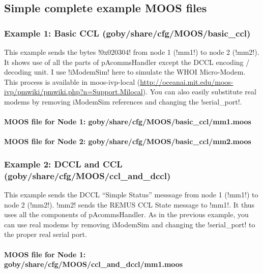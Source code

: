 \subsection{Simple complete example MOOS files}

\subsubsection{Example 1: Basic CCL (goby/share/cfg/MOOS/basic\_ccl)}\label{sec:moos_example_1}
This example sends the bytes !0x020304! from node 1 (!mm1!) to node 2 (!mm2!). It shows use of all the parts of pAcommsHandler except the DCCL encoding / decoding unit. I use !iModemSim! here to simulate the WHOI Micro-Modem. This process is available in moos-ivp-local (\url{http://oceanai.mit.edu/moos-ivp/pmwiki/pmwiki.php?n=Support.Milocal}). You can also easily substitute real modems by removing iModemSim references and changing the !serial_port!.

\paragraph{MOOS file for Node 1: goby/share/cfg/MOOS/basic\_ccl/mm1.moos}
\resetbvlinenumber

\paragraph{MOOS file for Node 2: goby/share/cfg/MOOS/basic\_ccl/mm2.moos}
\resetbvlinenumber

\subsubsection{Example 2: DCCL and CCL (goby/share/cfg/MOOS/ccl\_and\_dccl)}
This example sends the DCCL ``Simple Status'' messsage from node 1 (!mm1!) to node 2 (!mm2!). !mm2! sends the REMUS CCL State message to !mm1!. It thus uses all the components of pAcommsHandler. As in the previous example, you can use real modems by removing iModemSim and changing the !serial_port! to the proper real serial port.

\paragraph{MOOS file for Node 1: goby/share/cfg/MOOS/ccl\_and\_dccl/mm1.moos}
\resetbvlinenumber


